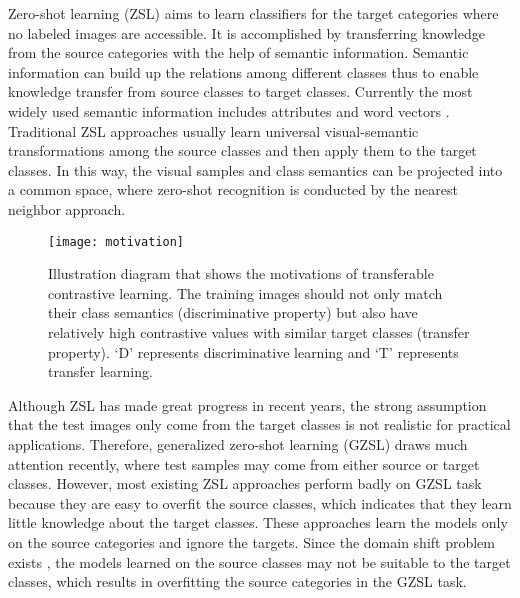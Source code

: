 \documentclass[10pt,twocolumn,letterpaper]{article}
\begin{document}
Zero-shot learning (ZSL) aims to learn classifiers for the target categories where no labeled images are accessible. It is accomplished by transferring knowledge from the source categories with the help of semantic information. Semantic information can build up the relations among different classes thus to enable knowledge transfer from source classes to target classes. Currently the most widely used semantic information includes attributes \cite{lampert2009learning,farhadi2009describing} and word vectors \cite{frome2013devise,akata2015evaluation}. Traditional ZSL approaches usually learn universal visual-semantic transformations among the source classes and then apply them to the target classes. In this way, the visual samples and class semantics can be projected into a common space, where zero-shot recognition is conducted by the nearest neighbor approach.

\begin{figure}[t]
\centering
\texttt{[image: motivation]}
\caption{Illustration diagram that shows the motivations of transferable contrastive learning. The training images should not only match their class semantics (discriminative property) but also have relatively high contrastive values with similar target classes (transfer property). `D' represents discriminative learning and `T' represents transfer learning.}
\label{fig:motivation}
\end{figure}

Although ZSL has made great progress in recent years, the strong assumption that the test images only come from the target classes is not realistic for practical applications. Therefore, generalized zero-shot learning (GZSL) \cite{chao2016empirical,Xian2017ZeroShotL} draws much attention recently, where test samples may come from either source or target classes. However, most existing ZSL approaches perform badly on GZSL task because they are easy to overfit the source classes, which indicates that they learn little knowledge about the target classes. These approaches learn the models only on the source categories and ignore the targets. Since the domain shift problem exists \cite{Fu2015TransductiveMZ}, the models learned on the source classes may not be suitable to the target classes, which results in overfitting the source categories in the GZSL task.
\end{document}
